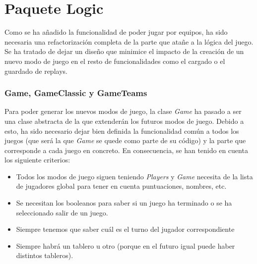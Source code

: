 \documentclass{article}
\begin{document}
\section*{Paquete Logic}
Como se ha añadido la funcionalidad de poder jugar por equipos, ha sido necesaria una refactorización completa de la parte que atañe a la lógica del juego. Se ha tratado de dejar un diseño que minimice el impacto de la creación de un nuevo modo de juego en el resto de funcionalidades como el cargado o el guardado de replays.

\subsubsection*{Game, GameClassic y GameTeams}
Para poder generar los nuevos modos de juego, la clase \textit{Game} ha pasado a ser una clase abstracta de la que extenderán los futuros modos de juego. Debido a esto, ha sido necesario dejar bien definida la funcionalidad común a todos los juegos (que será la que \textit{Game} se quede como parte de su código) y la parte que corresponde a cada juego en concreto. En consecuencia, se han tenido en cuenta los siguiente criterios:
\begin{itemize}
\item Todos los modos de juego siguen teniendo \textit{Players} y \textit{Game} necesita de la lista de jugadores global para tener en cuenta puntuaciones, nombres, etc.
\item Se necesitan los booleanos para saber si un juego ha terminado o se ha seleccionado salir de un juego.
\item Siempre tenemos que saber cuál es el turno del jugador correspondiente
\item Siempre habrá un tablero u otro (porque en el futuro igual puede haber distintos tableros).
\end{itemize}
\end{document}
